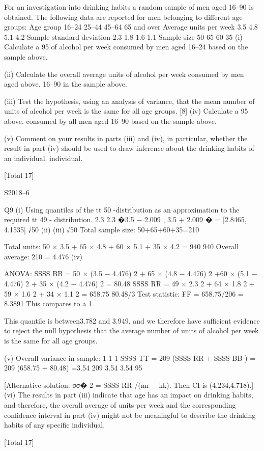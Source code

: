 \documentclass[a4paper,12pt]{article}
\begin{document}
For an investigation into drinking habits a random sample of men aged 16–90 is
obtained. The following data are reported for men belonging to different age groups:
Age group
16–24 25–44 45–64 65 and over
Average units per week 3.5 4.8 5.1 4.2
Sample standard deviation 2.3 1.8 1.6 1.1
Sample size 50 65 60 35
(i)
Calculate a 95%
of alcohol per week consumed by men aged 16–24 based on the sample above.


(ii) Calculate the overall average units of alcohol per week consumed by men aged
above.
16–90 in the sample above.

(iii) Test the hypothesis, using an analysis of variance, that the mean number of
units of alcohol per week is the same for all age groups. 
[8]
(iv) Calculate a 95%
above.
consumed by all men aged 16–90 based on the sample above.

(v) Comment on your results in parts (iii) and (iv), in particular, whether the result
in part (iv) should be used to draw inference about the drinking habits of an
individual.
individual.

[Total 17]

S2018–6

Q9
(i)
Using quantiles of the tt 50 -distribution as an approximation to the required tt 49 -
distribution.
2.3
2.3
�3.5 − 2.009
, 3.5 + 2.009 � = [2.8465, 4.1535]
√50
(ii)
(iii)
√50
Total sample size: 50+65+60+35=210

Total units: 50 × 3.5 + 65 × 4.8 + 60 × 5.1 + 35 × 4.2 = 940
940
Overall average: 210 = 4.476
(iv)

ANOVA:
SSSS BB = 50 × (3.5 − 4.476) 2 + 65 × (4.8 − 4.476) 2
+60 × (5.1 − 4.476) 2 + 35 × (4.2 − 4.476) 2
= 80.48
SSSS RR = 49 × 2.3 2 + 64 × 1.8 2 + 59 × 1.6 2 + 34 × 1.1 2 = 658.75
80.48/3
Test statistic: FF = 658.75/206 = 8.3891
This compares to a 1%






This quantile is between3.782 and 3.949, and we therefore have sufficient evidence to reject the null hypothesis that the average number of units of alcohol per week is the same for all age groups.

(v)
Overall variance in sample:
1
1
1
SSSS TT = 209 (SSSS RR + SSSS BB ) = 209 (658.75 + 80.48) =3.54
209
3.54
3.54
95%


[Alternative solution: σσ� 2 = SSSS RR /(nn − kk). Then CI is (4.234,4.718).]
(vi)
The results in part (iii) indicate that age has an impact on drinking habits,
and therefore, the overall average of units per week and the corresponding
confidence interval in part (iv) might not be meaningful to describe the drinking
habits of any specific individual.

[Total 17]

\end{document}

